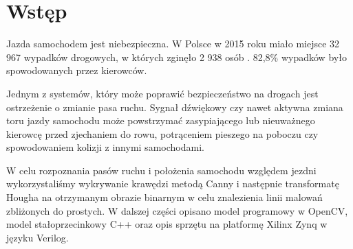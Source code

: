 \section{Wstęp}

Jazda samochodem jest niebezpieczna. W Polsce w 2015 roku miało miejsce 32 967 wypadków drogowych, w których zginęło 2 938 osób \cite{policja}. 82,8\% wypadków było spowodowanych przez kierowców.

Jednym z systemów, który może poprawić bezpieczeństwo na drogach jest ostrzeżenie o zmianie pasa ruchu. Sygnał dźwiękowy czy nawet aktywna zmiana toru jazdy samochodu może powstrzymać zasypiającego lub nieuważnego kierowcę przed zjechaniem do rowu, potrąceniem pieszego na poboczu czy spowodowaniem kolizji z innymi samochodami.

W celu rozpoznania pasów ruchu i położenia samochodu względem jezdni wykorzystaliśmy wykrywanie krawędzi metodą Canny i następnie transformatę Hougha na otrzymanym obrazie binarnym w celu znalezienia linii malowań zbliżonych do prostych. W dalszej części opisano model programowy w OpenCV, model stałoprzecinkowy C++ oraz opis sprzętu na platformę Xilinx Zynq w języku Verilog.

